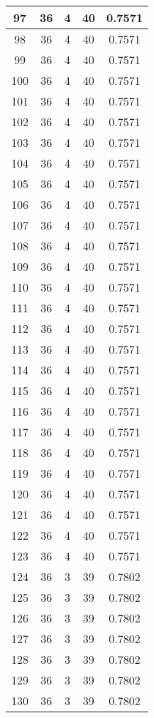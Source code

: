 \documentclass[letterpaper, 12pt]{article}
\begin{document}
\begin{longtable}{|c|c|c|c|c|}
\hline
97 & 36 & 4 & 40 & 0.7571 \\
\hline
98 & 36 & 4 & 40 & 0.7571 \\
\hline
99 & 36 & 4 & 40 & 0.7571 \\
\hline
100 & 36 & 4 & 40 & 0.7571 \\
\hline
101 & 36 & 4 & 40 & 0.7571 \\
\hline
102 & 36 & 4 & 40 & 0.7571 \\
\hline
103 & 36 & 4 & 40 & 0.7571 \\
\hline
104 & 36 & 4 & 40 & 0.7571 \\
\hline
105 & 36 & 4 & 40 & 0.7571 \\
\hline
106 & 36 & 4 & 40 & 0.7571 \\
\hline
107 & 36 & 4 & 40 & 0.7571 \\
\hline
108 & 36 & 4 & 40 & 0.7571 \\
\hline
109 & 36 & 4 & 40 & 0.7571 \\
\hline
110 & 36 & 4 & 40 & 0.7571 \\
\hline
111 & 36 & 4 & 40 & 0.7571 \\
\hline
112 & 36 & 4 & 40 & 0.7571 \\
\hline
113 & 36 & 4 & 40 & 0.7571 \\
\hline
114 & 36 & 4 & 40 & 0.7571 \\
\hline
115 & 36 & 4 & 40 & 0.7571 \\
\hline
116 & 36 & 4 & 40 & 0.7571 \\
\hline
117 & 36 & 4 & 40 & 0.7571 \\
\hline
118 & 36 & 4 & 40 & 0.7571 \\
\hline
119 & 36 & 4 & 40 & 0.7571 \\
\hline
120 & 36 & 4 & 40 & 0.7571 \\
\hline
121 & 36 & 4 & 40 & 0.7571 \\
\hline
122 & 36 & 4 & 40 & 0.7571 \\
\hline
123 & 36 & 4 & 40 & 0.7571 \\
\hline
124 & 36 & 3 & 39 & 0.7802 \\
\hline
125 & 36 & 3 & 39 & 0.7802 \\
\hline
126 & 36 & 3 & 39 & 0.7802 \\
\hline
127 & 36 & 3 & 39 & 0.7802 \\
\hline
128 & 36 & 3 & 39 & 0.7802 \\
\hline
129 & 36 & 3 & 39 & 0.7802 \\
\hline
130 & 36 & 3 & 39 & 0.7802 \\

\end{longtable}
\end{document}
